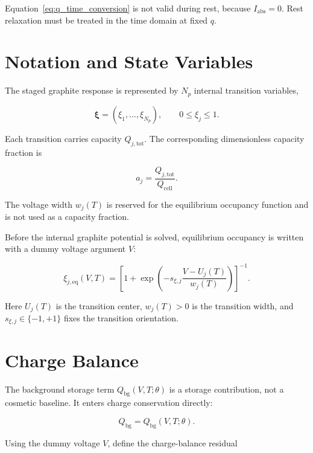 \documentclass[11pt,a4paper]{article}
\newcommand{\cell}{\mathrm{cell}}
\newcommand{\bg}{\mathrm{bg}}
\newcommand{\tot}{\mathrm{tot}}
\newcommand{\eq}{\mathrm{eq}}
\newcommand{\absI}{I_{\mathrm{abs}}}
\begin{document}
Equation~\eqref{eq:q_time_conversion} is not valid during rest, because \(\absI=0\). Rest relaxation must be treated in the time domain at fixed \(q\).

\section{Notation and State Variables}

The staged graphite response is represented by \(N_p\) internal transition variables,

\begin{equation}
\bm{\xi}=(\xi_1,\ldots,\xi_{N_p}),
\qquad
0\le \xi_j\le 1.
\label{eq:xi_vector}
\end{equation}

Each transition carries capacity \(Q_{j,\tot}\). The corresponding dimensionless capacity fraction is

\begin{equation}
a_j=\frac{Q_{j,\tot}}{Q_{\cell}}.
\label{eq:capacity_fraction}
\end{equation}

The voltage width \(w_j(T)\) is reserved for the equilibrium occupancy function and is not used as a capacity fraction.

Before the internal graphite potential is solved, equilibrium occupancy is written with a dummy voltage argument \(V\):

\begin{equation}
\xi_{j,\eq}(V,T)=
\left[
1+
\exp\!\left(
-s_{\xi,j}\frac{V-U_j(T)}{w_j(T)}
\right)
\right]^{-1}.
\label{eq:xi_equilibrium}
\end{equation}

Here \(U_j(T)\) is the transition center, \(w_j(T)>0\) is the transition width, and \(s_{\xi,j}\in\{-1,+1\}\) fixes the transition orientation.

\section{Charge Balance}

The background storage term \(Q_{\bg}(V,T;\theta)\) is a storage contribution, not a cosmetic baseline. It enters charge conservation directly:

\begin{equation}
Q_{\bg}=Q_{\bg}(V,T;\theta).
\label{eq:q_background}
\end{equation}

Using the dummy voltage \(V\), define the charge-balance residual
\end{document}
